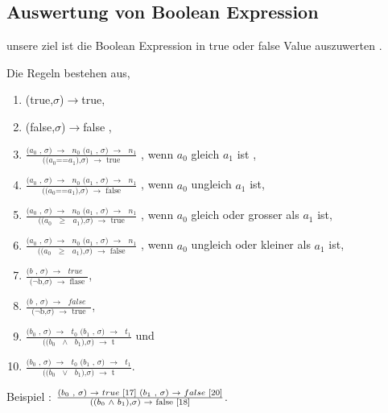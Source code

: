 \documentclass[a4paper,12pt,twoside,headsepline]{scrartcl}
\begin{document}
\subsection{Auswertung von Boolean Expression}  

unsere ziel ist die Boolean Expression in true oder false Value auszuwerten . 

     
 Die Regeln bestehen aus, 
 \begin{enumerate}
 \item \label{11} (true,$\sigma$)$\to$true, 
	\item \label{12} (false,$\sigma$)$\to$false ,
	\item \label{13}  $\frac  {\text {($a_0$ , $\sigma$) $\to$ $n_0$   ($a_1$ , $\sigma$) $\to$ $n_1$} } { \text{(($a_0$==$a_1$),$\sigma$) $\to$ true} }$  
	, wenn $a_0$ gleich $a_1$ ist ,
	\item \label{14}  $\frac  {\text {($a_0$ , $\sigma$) $\to$ $n_0$   ($a_1$ , $\sigma$) $\to$ $n_1$} } { \text{(($a_0$==$a_1$),$\sigma$) $\to$ false} }$
	, wenn $a_0$ ungleich $a_1$ ist,
	\item \label{15}  $\frac  {\text {($a_0$ , $\sigma$) $\to$ $n_0$   ($a_1$ , $\sigma$) $\to$ $n_1$} } { \text{(($a_0$ $\geq$ $a_1$),$\sigma$) $\to$ true} }$
	, wenn $a_0$ gleich oder grosser als $a_1$ ist,
	\item \label{16}  $\frac  {\text {($a_0$ , $\sigma$) $\to$ $n_0$   ($a_1$ , $\sigma$) $\to$ $n_1$} } { \text{(($a_0$ $\geq$ $a_1$),$\sigma$) $\to$ false} }$
	, wenn $a_0$ ungleich oder kleiner als $a_1$ ist,
	
	\item \label{17} $\frac  {\text {($b$ , $\sigma$) $\to$ $true$ } } { \text{($\neg$b,$\sigma$) $\to$ flase} }$,
	\item \label{20} $\frac  {\text {($b$ , $\sigma$) $\to$ $false$ } } { \text{($\neg$b,$\sigma$) $\to$ true} }$,
	
	\item \label{18} $\frac  {\text {($b_0$ , $\sigma$) $\to$ $t_0$   ($b_1$ , $\sigma$) $\to$ $t_1$} } { \text{(($b_0$ $\land$ $b_1$),$\sigma$) $\to$ t} }$ und
	\item \label{19} $\frac  {\text {($b_0$ , $\sigma$) $\to$ $t_0$   ($b_1$ , $\sigma$) $\to$ $t_1$} } { \text{(($b_0$ $\vee$ $b_1$),$\sigma$) $\to$ t} }$.	
\end{enumerate}  
Beispiel : $\frac  {\text {($b_0$ , $\sigma$) $\to$ $true$ $\ref{17}$   ($b_1$ , $\sigma$) $\to$ $false$ $\ref{20}$} } { \text{(($b_0$ $\land$ $b_1$),$\sigma$) $\to$ false $\ref{18}$} }$.\\
\end{document}
